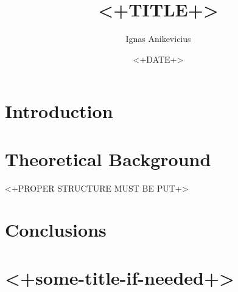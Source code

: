 \documentclass[
    fontsize=11pt,
    draft,
    DIV=calc,
    BCOR=1mm
]{scrartcl}
\title{<+TITLE+>}
\author{Ignas Anikevicius}
\date{<+DATE+>}
\begin{document}
\maketitle

\section{Introduction}
\section{Theoretical Background}

<+PROPER STRUCTURE MUST BE PUT+>

\section{Conclusions}

\printbibliography

\appendix
\section{<+some-title-if-needed+>}
\end{document}
